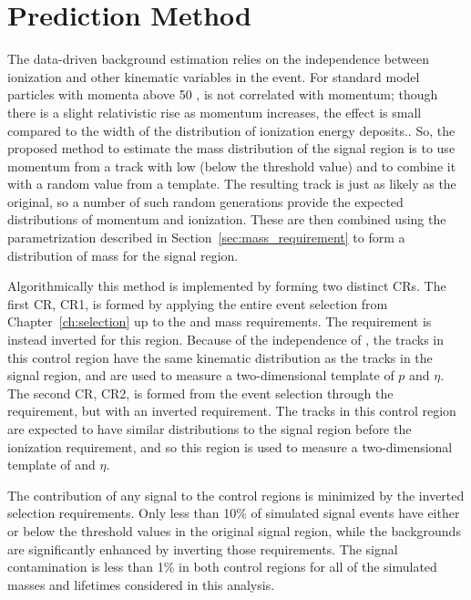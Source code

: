 
\section{Prediction Method}

The data-driven background estimation relies on the independence between ionization and other kinematic variables in the event.
For standard model particles with momenta above 50 \GeV, \dedx is not correlated with momentum; though there is a slight relativistic rise as momentum increases, the effect is small compared to the width of the distribution of ionization energy deposits..
So, the proposed method to estimate the mass distribution of the signal region is to use momentum from a track with low \dedx (below the threshold value) and to combine it with a random \dedx value from a \dedx template.
The resulting track is just as likely as the original, so a number of such random generations provide the expected distributions of momentum and ionization.
These are then combined using the parametrization described in Section~\ref{sec:mass_requirement} to form a distribution of mass for the signal region.

Algorithmically this method is implemented by forming two distinct \acp{CR}.
The first \ac{CR}, CR1, is formed by applying the entire event selection from Chapter~\ref{ch:selection} up to the \dedx and mass requirements.
The \dedx requirement is instead inverted for this region.
Because of the independence of \dedx, the tracks in this control region have the same kinematic distribution as the tracks in the signal region, and are used to measure a two-dimensional template of $p$ and $\eta$. 
The second \ac{CR}, CR2, is formed from the event selection through the \dedx requirement, but with an inverted \met requirement.
The tracks in this control region are expected to have similar \dedx distributions to the signal region before the ionization requirement, and so this region is used to measure a two-dimensional template of \dedx and $\eta$. 

The contribution of any signal to the control regions is minimized by the inverted selection requirements.
Only less than 10\% of simulated signal events have either \dedx or \met below the threshold values in the original signal region, while the backgrounds are significantly enhanced by inverting those requirements.
The signal contamination is less than 1\% in both control regions for all of the simulated masses and lifetimes considered in this analysis.

